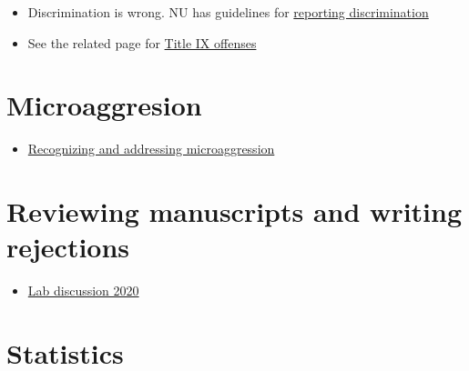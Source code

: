 \documentclass[
  letterpaper,
  DIV=11,
  numbers=noendperiod]{scrreprt}
\providecommand{\tightlist}{%
  \setlength{\itemsep}{0pt}\setlength{\parskip}{0pt}}\usepackage{longtable,booktabs,array}
\begin{document}

\begin{itemize}
\item
  Discrimination is wrong. NU has guidelines for
  \href{https://www.northeastern.edu/ouec/reporting-options/discrimination/}{reporting
  discrimination}
\item
  See the related page for
  \href{https://www.northeastern.edu/ouec/reporting-options/titleix-prohibited-offenses/}{Title
  IX offenses}
\end{itemize}

\hypertarget{microaggresion}{%
\section*{\texorpdfstring{\textbf{Microaggresion}}{Microaggresion}}\label{microaggresion}}


\begin{itemize}
\tightlist
\item
  \href{https://github.com/DrK-Lo/lotterhoslabprotocols/blob/gh-pages/Recognizing\%20and\%20Addressing\%20Microaggressions\%20Takewaways\%202021.pdf}{Recognizing
  and addressing microaggression}
\end{itemize}

\hypertarget{reviewing-manuscripts-and-writing-rejections}{%
\section*{\texorpdfstring{\textbf{Reviewing manuscripts and writing
rejections}}{Reviewing manuscripts and writing rejections}}\label{reviewing-manuscripts-and-writing-rejections}}


\begin{itemize}
\tightlist
\item
  \href{https://docs.google.com/document/d/1BGYn66Q0mkXOwL5S_woHOLh7__dTHQzQDxRc5EnKLNw/edit\#}{Lab
  discussion 2020}
\end{itemize}

\hypertarget{statistics}{%
\section*{\texorpdfstring{\textbf{Statistics}}{Statistics}}\label{statistics}}
\end{document}
